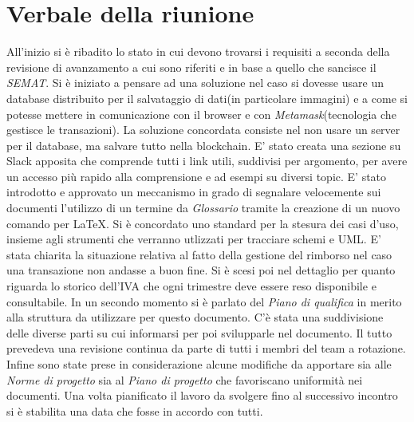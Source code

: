 \section{Verbale della riunione}
All'inizio si è ribadito lo stato in cui devono trovarsi i requisiti a seconda della revisione di avanzamento a cui sono riferiti e in base a quello che sancisce il \textit{SEMAT}.\newline
Si è iniziato a pensare ad una soluzione nel caso si dovesse usare un database distribuito per il salvataggio di dati(in particolare immagini) e a come si potesse mettere in comunicazione con il browser e con \textit{Metamask}(tecnologia che gestisce le transazioni). La soluzione concordata consiste nel non usare un server per il database, ma salvare tutto nella blockchain.\newline
E' stato creata una sezione su Slack apposita che comprende tutti i  link utili, suddivisi per argomento, per avere un accesso più rapido alla comprensione e ad esempi su diversi topic. \newline
E' stato introdotto e approvato un meccanismo in grado di segnalare velocemente sui documenti l'utilizzo di un termine da \textit{Glossario} tramite la creazione di un nuovo comando per \LaTeX. \newline
Si è concordato uno standard per la stesura dei casi d'uso, insieme agli strumenti che verranno utlizzati per tracciare schemi e UML. \newline
E' stata chiarita la situazione relativa al fatto della gestione del rimborso nel caso una transazione non andasse a buon fine. Si è scesi poi nel dettaglio per quanto riguarda lo storico dell'IVA che ogni trimestre deve essere reso disponibile e consultabile. \newline
In un secondo momento si è parlato del \textit{Piano di qualifica} in merito alla struttura da utilizzare per questo documento. C'è stata una suddivisione delle diverse parti su cui informarsi per poi svilupparle nel documento. Il tutto prevedeva una revisione continua da parte di tutti i membri del team a rotazione. \newline
Infine sono state prese in considerazione alcune modifiche da apportare sia alle \textit{Norme di progetto} sia al \textit{Piano di progetto} che favoriscano uniformità nei documenti. Una volta pianificato il lavoro da svolgere fino al successivo incontro si è stabilita una data che fosse in accordo con tutti.
\pagebreak
